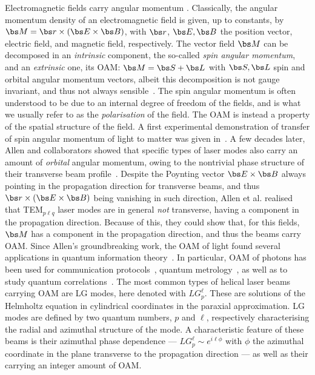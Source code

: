 Electromagnetic fields carry angular momentum \cite{jackson1999classical}.
Classically, the angular momentum density of an electromagnetic field is given, up to constants, by
$\bs M =\bs r\times(\bs E\times \bs B)$, with $\bs r$, $\bs E, \bs B$ the position vector, electric field, and magnetic field, respectively.
The vector field $\bs M$ can be decomposed in an \emph{intrinsic} component, the so-called \emph{spin angular momentum}, and an \emph{extrinsic} one, its \ac{OAM}: $\bs M=\bs S+\bs L$ with $\bs S,\bs L$ spin and orbital angular momentum vectors, albeit this decomposition is not gauge invariant, and thus not always sensible~\cite{ohanian1986what,cameron2015azimuthal}.
The spin angular momentum is often understood to be due to an internal degree of freedom of the fields, and is what we usually refer to as the \emph{polarisation} of the field. The OAM is instead a property of the spatial structure of the field.
A first experimental demonstration of transfer of spin angular momentum of light to matter was given in~\cite{beth1936mechanical}. A few decades later, Allen and collaborators showed that specific types of laser modes also carry an amount of \emph{orbital} angular momentum, owing to the nontrivial phase structure of their transverse beam profile~\cite{allen1992orbital}.
Despite the Poynting vector $\bs E\times \bs B$ always pointing in the propagation direction for transverse beams, and thus $\bs r\times(\bs E\times\bs B)$ being vanishing in such direction, Allen et al. realised that TEM$_{p\ell q}$ laser modes are in general \emph{not} transverse, having a component in the propagation direction. Because of this, they could show that, for this fields, $\bs M$ has a component in the propagation direction, and thus the beams carry OAM.
Since Allen's groundbreaking work, the OAM of light found several applications in quantum information theory~\cite{allen1999orbital,padgett2004lights,barnett2007orbital,molina-terriza2007twisted,franke-arnold2008advances,yao2011orbital,padgett2017orbital,erhard2017twisted,cozzolino2019highdimensional}.
In particular, OAM of photons has been used for communication protocols~\cite{langford2004measuring}, quantum metrology~\cite{dambrosio2013photonic}, as well as to study quantum correlations~\cite{leach2010quantum,mair2001entanglement,vaziri2002experimental,dada2011experimental,pors2011highdimensional,fickler2012quantum,malik2016multiphoton}.
The most common types of helical laser beams carrying OAM are \ac{LG} modes, here denoted with $LG_p^\ell$. These are solutions of the Helmholtz equation in cylindrical coordinates in the paraxial approximation. LG modes are defined by two quantum numbers, $p$ and $\ell$, respectively characterising the radial and azimuthal structure of the mode. A characteristic feature of these beams is their azimuthal phase dependence --- $LG_p^\ell\sim e^{i\ell\phi}$ with $\phi$ the azimuthal coordinate in the plane transverse to the propagation direction --- as well as their carrying an integer amount of OAM.
